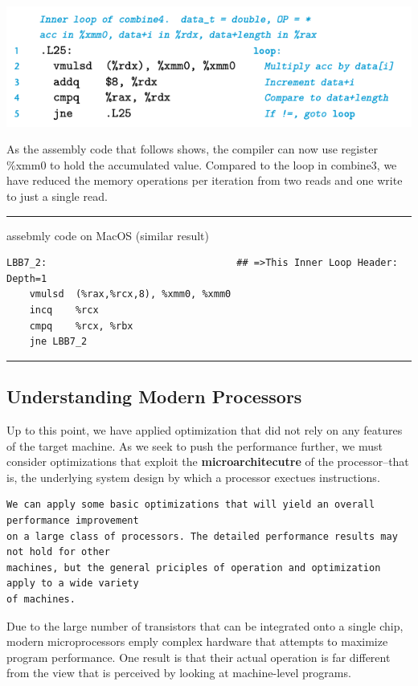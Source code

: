 \documentclass[11pt]{article}
\begin{document}
\begin{center}
\includegraphics[width=.9\linewidth]{pics/combine4-assembly.png}
\end{center}

As the assembly code that follows shows, the compiler can now use register \%xmm0 to hold the accumulated value. Compared to the loop in combine3, we have reduced the memory operations per iteration from two reads and one write to just a single read.\\

\noindent\rule{\textwidth}{0.5pt}
assebmly code on MacOS (similar result)\\
\begin{verbatim}
LBB7_2:                                 ## =>This Inner Loop Header: Depth=1
	vmulsd	(%rax,%rcx,8), %xmm0, %xmm0
	incq	%rcx
	cmpq	%rcx, %rbx
	jne	LBB7_2

\end{verbatim}

\noindent\rule{\textwidth}{0.5pt}

\subsection{Understanding Modern Processors}
\label{sec:org9749e5e}
Up to this point, we have applied optimization that did not rely on any features of the target machine. As we seek to push the performance further, we must consider optimizations that exploit the \textbf{microarchitecutre} of the processor--that is, the underlying system design by which a processor exectues instructions.\\

\begin{verbatim}
We can apply some basic optimizations that will yield an overall performance improvement
on a large class of processors. The detailed performance results may not hold for other
machines, but the general priciples of operation and optimization apply to a wide variety
of machines.
\end{verbatim}


Due to the large number of transistors that can be integrated onto a single chip, modern microprocessors emply complex hardware that attempts to maximize program performance. One result is that their actual operation is far different from the view that is perceived by looking at machine-level programs.\\
\end{document}
